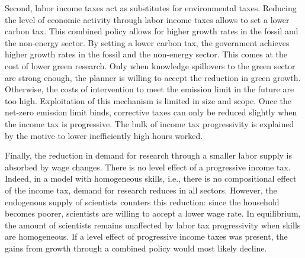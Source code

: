 Second, labor income taxes act as substitutes for environmental taxes. Reducing the level of economic activity through labor income taxes allows to set a lower carbon tax.
This combined policy allows for higher growth rates in the fossil and the non-energy sector. 
By setting a lower carbon tax, the government achieves higher growth rates in the fossil and the non-energy sector. This comes at the cost of lower green research. Only when knowledge spillovers to the green sector are strong enough, the planner is willing to accept the reduction in green growth. Otherwise, the costs of intervention to meet the emission limit in the future are too high. %
Exploitation of this mechanism is limited in size and scope. Once the net-zero emission limit binds, corrective taxes can only be reduced slightly when the income tax is progressive. The bulk of income tax progressivity is explained by the motive to lower inefficiently high hours worked.

Finally, the reduction in demand for research through a smaller labor supply is absorbed by wage changes. There is no level effect of a progressive income tax. Indeed, in a model with homogeneous skills, i.e., there is no compositional effect of the income tax, demand for research reduces in all sectors. However, the endogenous supply of scientists counters this reduction: since the household becomes poorer, scientists are willing to accept a lower wage rate. In equilibrium, the amount of scientists remains unaffected by labor tax progressivity when skills are homogeneous. 
If a level effect of progressive income taxes was present, the gains from growth through a combined policy would most likely decline.

